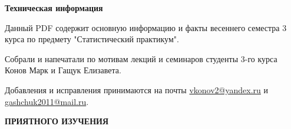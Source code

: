\begin{center}
	{\Large \textbf{Техническая информация}}
\end{center}

\vspace{0.5cm}
Данный PDF содержит основную информацию и факты весеннего семестра 3 курса по предмету "Статистический практикум".

\vspace{0.5cm}
Собрали и напечатали по мотивам лекций и семинаров студенты 3-го курса Конов Марк и Гащук Елизавета.

\vspace{0.5cm}
Добавления и исправления принимаются на почты \href{}{vkonov2@yandex.ru} и \href{}{gashchuk2011@mail.ru}.
\vspace{0.5cm}
\begin{center}
	{\Large \textbf{ПРИЯТНОГО ИЗУЧЕНИЯ}}
\end{center}

\newpage

